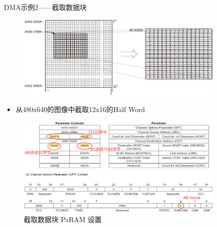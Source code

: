 \documentclass[10pt]{ctexbeamer}
\begin{document}
    \begin{frame}[allowframebreaks]{DMA示例2——截取数据块}
        \begin{figure}
            \centering
            \includegraphics[width=0.9\textwidth]{summary/14.eps}
        \end{figure}
        \vspace{0.5cm}
        \begin{itemize}
            \item 从480x640的图像中截取12x16的Half Word
        \end{itemize}
        
        \begin{figure}
            \centering
            \includegraphics[width=0.9\textwidth]{summary/15.eps}
            \caption{截取数据块 PaRAM 设置}
        \end{figure}
    \end{frame}
\end{document}

